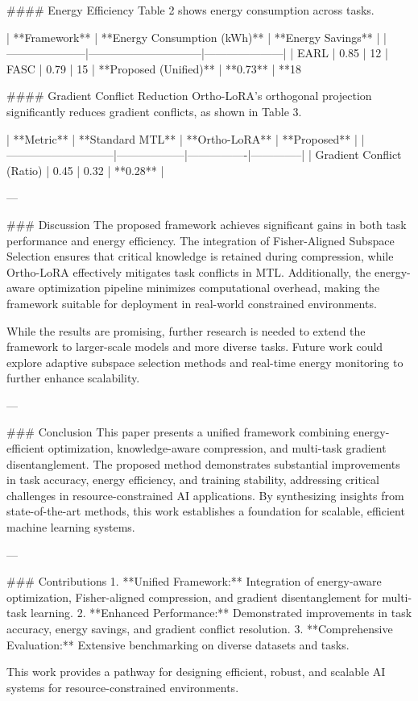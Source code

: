 #### Energy Efficiency
Table 2 shows energy consumption across tasks.

| **Framework**      | **Energy Consumption (kWh)** | **Energy Savings** |
|---------------------|------------------------------|---------------------|
| EARL               | 0.85                         | 12%
| FASC               | 0.79                         | 15%
| **Proposed (Unified)**   | **0.73**                     | **18%

#### Gradient Conflict Reduction
Ortho-LoRA's orthogonal projection significantly reduces gradient conflicts, as shown in Table 3.

| **Metric**                  | **Standard MTL** | **Ortho-LoRA** | **Proposed** |
|-----------------------------|------------------|----------------|--------------|
| Gradient Conflict (Ratio)   | 0.45            | 0.32           | **0.28**     |

---

### Discussion
The proposed framework achieves significant gains in both task performance and energy efficiency. The integration of Fisher-Aligned Subspace Selection ensures that critical knowledge is retained during compression, while Ortho-LoRA effectively mitigates task conflicts in MTL. Additionally, the energy-aware optimization pipeline minimizes computational overhead, making the framework suitable for deployment in real-world constrained environments.

While the results are promising, further research is needed to extend the framework to larger-scale models and more diverse tasks. Future work could explore adaptive subspace selection methods and real-time energy monitoring to further enhance scalability.

---

### Conclusion
This paper presents a unified framework combining energy-efficient optimization, knowledge-aware compression, and multi-task gradient disentanglement. The proposed method demonstrates substantial improvements in task accuracy, energy efficiency, and training stability, addressing critical challenges in resource-constrained AI applications. By synthesizing insights from state-of-the-art methods, this work establishes a foundation for scalable, efficient machine learning systems.

---

### Contributions
1. **Unified Framework:** Integration of energy-aware optimization, Fisher-aligned compression, and gradient disentanglement for multi-task learning.
2. **Enhanced Performance:** Demonstrated improvements in task accuracy, energy savings, and gradient conflict resolution.
3. **Comprehensive Evaluation:** Extensive benchmarking on diverse datasets and tasks.

This work provides a pathway for designing efficient, robust, and scalable AI systems for resource-constrained environments.